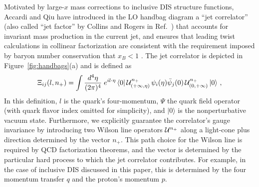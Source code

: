\documentclass[preprintnumbers,floatfix,nofootinbib]{revtex4}
\newcommand{\de}{d}                    %
\begin{document}
Motivated by large-$x$ mass corrections to inclusive DIS structure functions,
Accardi and Qiu have introduced in the LO handbag diagram 
a ``jet correlator'' (also called ``jet factor'' by Collins and Rogers in Ref.~\cite{Collins:2007ph})
that accounts for invariant mass production in the current jet, and ensures
that leading twist calculations in collinear factorization are consistent with
the requirement imposed by baryon number conservation that $x_B<1$
\cite{Accardi:2008ne}. The jet correlator is depicted in
Figure~\ref{fig:handbags}(a) and is defined as 
\begin{align} 
\Xi_{ij}(l,n_+) =\int
  \frac{\de^4\eta}{(2\pi)^4}\; e^{i l \cdot \eta}\,
    \langle 0|\, {\cal U}^{n_+}_{(+\infty,\eta)}
\,\psi_i(\eta)
             \bar{\psi}_j(0)\,
{\cal U}^{n_+}_{(0,+\infty)}\,   |0 \rangle \ ,
\label{e:xifull}
\end{align} 
In this definition, $l$ is the quark's four-momentum, $\Psi$ the quark field
operator (with quark flavor index omitted for simplicity), and $|0\rangle$ is
the nonperturbative vacuum state. Furthermore, we explicitly guarantee the
correlator's gauge invariance by introducing two Wilson line operators ${\cal
  U}^{n_+}$ along a light-cone plus direction determined by the vector
$n_+$. This path choice for the Wilson line is required by QCD factorization
theorems, and the vector is determined by the particular hard process to which
the jet correlator contributes. For example, in the case of inclusive DIS
discussed in this paper, this is determined by the four momentum transfer $q$
and the proton's momentum $p$. 
\end{document}
